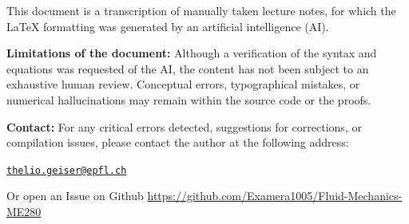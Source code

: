 \begin{tcolorbox}[colback=red!5!white,colframe=red!75!black,title={\Huge Disclaimer and Responsibility}]
    \large This document is a transcription of manually taken lecture notes, for which the \LaTeX{} formatting was generated by an artificial intelligence (AI). 
    
    \textbf{Limitations of the document:} Although a verification of the syntax and equations was requested of the AI, the content has not been subject to an exhaustive human review. Conceptual errors, typographical mistakes, or numerical hallucinations may remain within the source code or the proofs. 
    
    \textbf{Contact:} For any critical errors detected, suggestions for corrections, or compilation issues, please contact the author at the following address: 
    \begin{center}
        \href{mailto:thelio.geiser@epfl.ch}{\texttt{thelio.geiser@epfl.ch}}
    \end{center}
    \centering Or open an Issue on Github
    \centering \url{https://github.com/Examera1005/Fluid-Mechanics-ME280}
\end{tcolorbox}